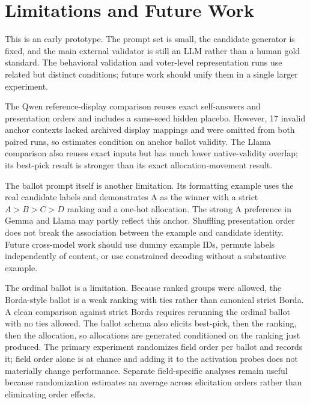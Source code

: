 \documentclass[11pt]{article}
\begin{document}
\section{Limitations and Future Work}

This is an early prototype. The prompt set is small, the candidate generator is
fixed, and the main external validator is still an LLM rather than a human
gold standard. The behavioral validation and voter-level representation runs
use related but distinct conditions; future work should unify them in a
single larger experiment.

The Qwen reference-display comparison reuses exact self-answers and presentation
orders and includes a same-seed hidden placebo. However, 17 invalid anchor
contexts lacked archived display mappings and were omitted from both paired
runs, so estimates condition on anchor ballot validity. The Llama comparison
also reuses exact inputs but has much lower native-validity overlap; its best-pick
result is stronger than its exact allocation-movement result.

The ballot prompt itself is another limitation. Its formatting example uses
the real candidate labels and demonstrates A as the winner with a strict
$A>B>C>D$ ranking and a one-hot allocation. The strong A preference in Gemma
and Llama may partly reflect this anchor. Shuffling presentation order does
not break the association between the example and candidate identity. Future
cross-model work should use dummy example IDs, permute labels independently
of content, or use constrained decoding without a substantive example.

The ordinal ballot is a limitation. Because ranked groups were allowed, the
Borda-style ballot is a weak ranking with ties rather than canonical strict
Borda. A clean comparison against strict Borda requires rerunning the ordinal
ballot with no ties allowed. The ballot schema also elicits best-pick, then
the ranking, then the allocation, so allocations are generated conditioned on
the ranking just produced. The primary experiment randomizes field order per
ballot and records it; field order alone is at chance and adding it to the
activation probes does not materially change performance. Separate
field-specific analyses remain useful because randomization estimates an
average across elicitation orders rather than eliminating order effects.
\end{document}
